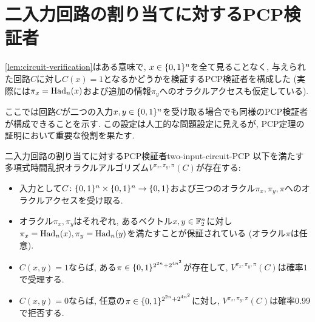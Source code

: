 \section{二入力回路の割り当てに対するPCP検証者}
\cref{lem:circuit-verification}はある意味で, $x\in\{0,1\}^n$を全て見ることなく, 与えられた回路$C$に対し$C(x)=1$となるかどうかを検証するPCP検証者を構成した (実際には$\pi_x=\mathrm{Had}_n(x)$および追加の情報$\pi_y$へのオラクルアクセスも仮定している).

ここでは回路$C$が二つの入力$x,y\in\{0,1\}^n$を受け取る場合でも同様のPCP検証者が構成できることを示す.
この設定は人工的な問題設定に見えるが, PCP定理の証明において重要な役割を果たす.

\begin{theorem}{二入力回路の割り当てに対するPCP検証者}{two-input-circuit-PCP}
  以下を満たす多項式時間乱択オラクルアルゴリズム$V^{\pi_x,\pi_y,\pi}(C)$が存在する:
  \begin{itemize}
    \item 入力として$C\colon\{0,1\}^n\times\{0,1\}^n\to\{0,1\}$および三つのオラクル$\pi_x,\pi_y, \pi$へのオラクルアクセスを受け取る.
    \item オラクル$\pi_x,\pi_y$はそれぞれ, あるベクトル$x,y\in\mathbb{F}_2^n$に対し$\pi_x=\mathrm{Had}_n(x),\pi_y=\mathrm{Had}_n(y)$を満たすことが保証されている (オラクル$\pi$は任意).
    \item $C(x,y)=1$ならば, ある$\pi\in \{0,1\}^{2^{2n} + 2^{4n^2}}$が存在して, $V^{\pi_x,\pi_y,\pi}(C)$は確率$1$で受理する.
    \item $C(x,y)=0$ならば, 任意の$\pi\in \{0,1\}^{2^{2n} + 2^{4n^2}}$に対し, $V^{\pi_x,\pi_y,\pi}(C)$は確率$0.99$で拒否する.
  \end{itemize}
\end{theorem}

